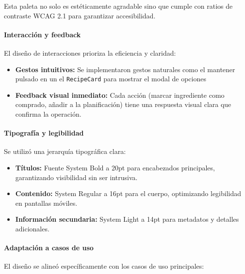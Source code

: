 \documentclass[twoside, openright, 11pt]{report}
\begin{document}
					Esta paleta no solo es estéticamente agradable sino que cumple con ratios de contraste WCAG 2.1 para garantizar accesibilidad.
				
				\paragraph*{Interacción y feedback}
					El diseño de interacciones prioriza la eficiencia y claridad:
					
					\begin{itemize}
						
						\item \textbf{Gestos intuitivos:} Se implementaron gestos naturales como el mantener pulsado en un el \texttt{RecipeCard} para mostrar el modal de opciones
						
						\item \textbf{Feedback visual inmediato:} Cada acción (marcar ingrediente como comprado, añadir a la planificación) tiene una respuesta visual clara que confirma la operación.
					\end{itemize}
				
				\paragraph*{Tipografía y legibilidad}
					Se utilizó una jerarquía tipográfica clara:
					
					\begin{itemize}
						\item \textbf{Títulos:} Fuente System Bold a 20pt para encabezados principales, garantizando visibilidad sin ser intrusiva.
						\item \textbf{Contenido:} System Regular a 16pt para el cuerpo, optimizando legibilidad en pantallas móviles.
						\item \textbf{Información secundaria:} System Light a 14pt para metadatos y detalles adicionales.
					\end{itemize}
				
				\paragraph*{Adaptación a casos de uso}
					El diseño se alineó específicamente con los casos de uso principales:
					
\end{document}
